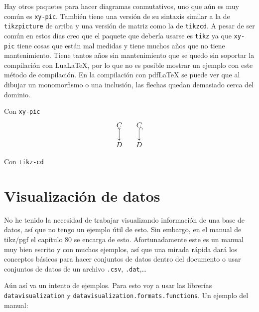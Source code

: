 Hay otros paquetes para hacer diagramas conmutativos, uno que aún es muy
común es \texttt{xy-pic}. También tiene una versión de su sintaxis similar
a la de \texttt{tikzpicture} de arriba y una versión de matriz como la de
\texttt{tikzcd}. A pesar de ser común en estos días creo que el paquete que
debería usarse es \texttt{tikz} ya que \texttt{xy-pic} tiene cosas que
están mal medidas y tiene muchos años que no tiene mantenimiento. Tiene
tantos años sin mantenimiento que se quedo sin soportar la compilación con
Lua\LaTeX, por lo que no es posible mostrar un ejemplo con este método de
compilación. En la compilación con pdf\LaTeX{} se puede ver que al dibujar
un monomorfismo o una inclusión, las flechas quedan demasiado cerca del
dominio.
\ifpdftex
\begin{minipage}{0.45\linewidth}
\centering
Con \texttt{xy-pic}
  \[
  \begin{xy}
    (0,0) *+{C} = "c1",
    (0,-10) *+{D} = "d1",
    (10,0) *+{C} = "c2",
    (10,-10) *+{D} = "d2",
    \POS "c1" \ar@{>->} "d1",
    \POS "c2" \ar@{^{(}->} "d2",
  \end{xy}
  \]
\end{minipage}%
\begin{minipage}{0.45\linewidth}
\centering
Con \texttt{tikz-cd}
  \begin{center}
    \end{center}
\end{minipage}
\fi


\section{Visualización de datos}
No he tenido la necesidad de trabajar visualizando información de una base
de datos, así que no tengo un ejemplo útil de esto. Sin embargo, en el
manual de tikz/pgf el capítulo 80 se encarga de esto. Afortunadamente este
es un manual muy bien escrito y con muchos ejemplos, así que una mirada
rápida dará los conceptos básicos para hacer conjuntos de datos dentro del
documento o usar conjuntos de datos de un archivo \texttt{.csv},
\texttt{.dat},\ldots

Aún así va un intento de ejemplos. Para esto voy a usar las librerías
\texttt{datavisualization} y \texttt{datavisualization.formats.functions}. Un ejemplo del manual:
\begin{center}
\end{center}



